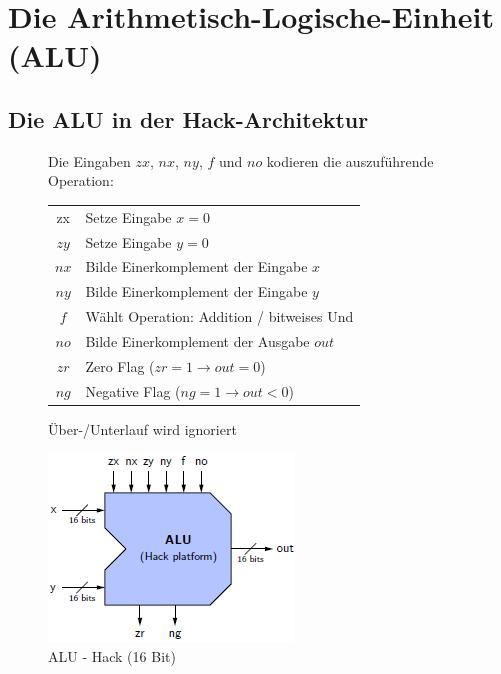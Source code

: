 \documentclass[12pt]{report}
\begin{document}
\section{Die Arithmetisch-Logische-Einheit (ALU)}
\subsection{Die ALU in der Hack-Architektur}
\begin{figure}[H]
  \begin{minipage}[t]{0.5\textwidth}
    Die Eingaben $zx$, $nx$, $ny$, $f$ und $no$ kodieren die auszuführende Operation:
    
    \begin{table}[H]
      \begin{tabular}{Cl}
        zx   & Setze Eingabe $x=0$                        \\
        $zy$ & Setze Eingabe $y=0$                        \\
        $nx$ & Bilde Einerkomplement der Eingabe $x$      \\
        $ny$ & Bilde Einerkomplement der Eingabe $y$      \\
        $f$  & Wählt Operation: Addition / bitweises Und  \\
        $no$ & Bilde Einerkomplement der Ausgabe $out$    \\
        $zr$ & Zero Flag ($zr=1 \rightarrow out = 0$)     \\
        $ng$ & Negative Flag ($ng=1 \rightarrow out < 0$)
      \end{tabular}
    \end{table}
    
    Über-/Unterlauf wird ignoriert
  \end{minipage}
  \hfill
  \begin{minipage}[t]{0.4\textwidth}
    \caption{ALU - Hack (16 Bit)}
    \label{fig:alu_der_hack-platform}
    \centering
    \includegraphics[width=\textwidth]{alu_der_hack-platform}
  \end{minipage}
\end{figure}
\end{document}
